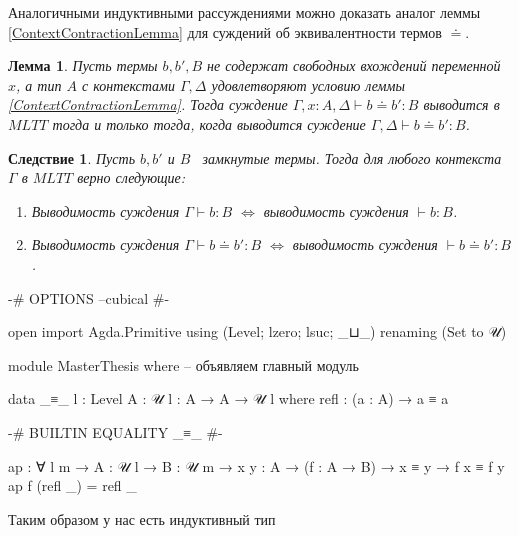 \documentclass{article}[12pt]
\newtheorem{lemma}{Лемма}
\newtheorem{corollary}{Следствие}
\newcommand{\dash}{\textemdash\ }
\begin{document}
Аналогичными индуктивными рассуждениями можно доказать аналог леммы \ref{ContextContractionLemma} для
суждений об эквивалентности термов $\doteq$.
\begin{lemma}
    \label{ContextContractionEqLemma}
    Пусть термы $b, b', B$ не содержат свободных вхождений переменной $x$, а тип $A$ с контекстами
    $\Gamma, \Delta$ удовлетворяют условию леммы \ref{ContextContractionLemma}. Тогда суждение
    $\Gamma, x : A, \Delta \vdash b \doteq b' : B$ выводится в $MLTT$ тогда и только тогда, когда
    выводится суждение $\Gamma, \Delta \vdash b \doteq b' : B$.
\end{lemma}

\begin{corollary}
    Пусть $b, b'$ и $B$ \dash замкнутые термы. Тогда для любого контекста $\Gamma$ в $MLTT$
    верно следующие:
    \begin{enumerate}
        \item Выводимость суждения $\Gamma \vdash b : B$ $\iff$ выводимость суждения $\vdash b : B$.
        \item Выводимость суждения $\Gamma \vdash b \doteq b' : B$ $\iff$ выводимость суждения $\vdash b \doteq b' : B$.
    \end{enumerate}
\end{corollary}

\begin{code}

{-# OPTIONS --cubical #-}

open import Agda.Primitive using (Level; lzero; lsuc; _⊔_)
                           renaming (Set to 𝒰)

module MasterThesis where -- объявляем главный модуль

data _≡_ {l : Level} {A : 𝒰 l} : A → A → 𝒰 l where
    refl : (a : A) → a ≡ a

{-# BUILTIN EQUALITY _≡_  #-}

ap : ∀ {l m} → {A : 𝒰 l} → {B : 𝒰 m} → {x y : A} 
     → (f : A → B) → x ≡ y → f x ≡ f y
ap f (refl _) = refl _

\end{code}

Таким образом у нас есть индуктивный тип 
\end{document}
